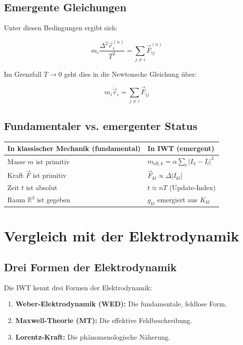 \subsection{Emergente Gleichungen}

Unter diesen Bedingungen ergibt sich:

\[
m_i \frac{\Delta^2 \vec{r}_i^{(n)}}{T^2} = \sum_{j \neq i} \vec{F}_{ij}^{(n)}
\]

Im Grenzfall \( T \to 0 \) geht dies in die Newtonsche Gleichung über:

\[
m_i \ddot{\vec{r}}_i = \sum_{j \neq i} \vec{F}_{ij}
\]

\subsection{Fundamentaler vs. emergenter Status}

\begin{center}
\begin{tabular}{|l|l|}
\hline
\textbf{In klassischer Mechanik (fundamental)} & \textbf{In IWT (emergent)} \\
\hline
Masse \( m \) ist primitiv & \( m_{\text{eff},k} = \alpha \sum_l |I_k - I_l|^2 \) \\
Kraft \( \vec{F} \) ist primitiv & \( \vec{F}_{kl} \propto \Delta |I_{kl}| \) \\
Zeit \( t \) ist absolut & \( t \approx nT \) (Update-Index) \\
Raum \( \mathbb{R}^3 \) ist gegeben & \( g_{kl} \) emergiert aus \( K_{kl} \) \\
\hline
\end{tabular}
\end{center}

\section{Vergleich mit der Elektrodynamik}

\subsection{Drei Formen der Elektrodynamik}

Die IWT kennt drei Formen der Elektrodynamik:
\begin{enumerate}
\item \textbf{Weber-Elektrodynamik (WED):} Die fundamentale, feldlose Form.
\item \textbf{Maxwell-Theorie (MT):} Die effektive Feldbeschreibung.
\item \textbf{Lorentz-Kraft:} Die phänomenologische Näherung.
\end{enumerate}

